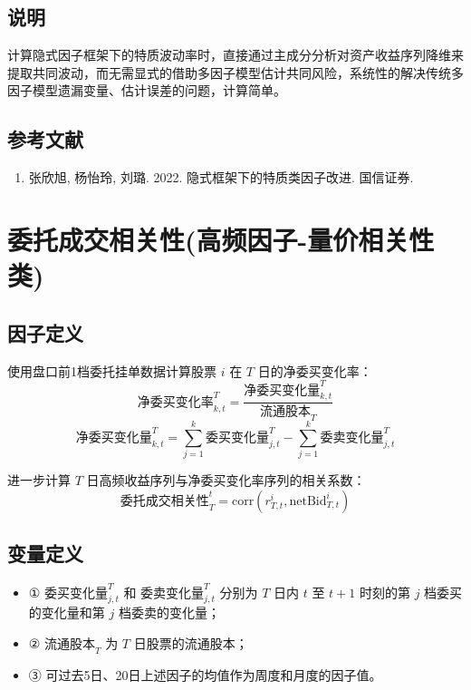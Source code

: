 \documentclass{article}
\begin{document}
\subsection{说明}
计算隐式因子框架下的特质波动率时，直接通过主成分分析对资产收益序列降维来提取共同波动，而无需显式的借助多因子模型估计共同风险，系统性的解决传统多因子模型遗漏变量、估计误差的问题，计算简单。

\subsection{参考文献}
\begin{enumerate}
    \item 张欣旭, 杨怡玲, 刘璐. 2022. 隐式框架下的特质类因子改进. 国信证券.
\end{enumerate}

\section{委托成交相关性(高频因子-量价相关性类)}

\subsection{因子定义}

使用盘口前1档委托挂单数据计算股票 \( i \) 在 \( T \) 日的净委买变化率：
\begin{equation}
    \text{净委买变化率}_{k,t}^T = \frac{\text{净委买变化量}_{k,t}^T}{\text{流通股本}_T}
\end{equation}
\begin{equation}
    \text{净委买变化量}_{k,t}^T = \sum_{j=1}^{k} \text{委买变化量}_{j,t}^T - \sum_{j=1}^{k} \text{委卖变化量}_{j,t}^T
\end{equation}

进一步计算 \( T \) 日高频收益序列与净委买变化率序列的相关系数：
\begin{equation}
    \text{委托成交相关性}^t_T = \mathrm{corr}(r_{T,t}^i, \mathrm{netBid}_{T,t}^i)
\end{equation}

\subsection{变量定义}
\begin{itemize}
    \item ① \( \text{委买变化量}_{j,t}^T \) 和 \( \text{委卖变化量}_{j,t}^T \) 分别为 \( T \) 日内 \( t \) 至 \( t+1 \) 时刻的第 \( j \) 档委买的变化量和第 \( j \) 档委卖的变化量；
    \item ② \( \text{流通股本}_T \) 为 \( T \) 日股票的流通股本；
    \item ③ 可过去5日、20日上述因子的均值作为周度和月度的因子值。
\end{itemize}
\end{document}
